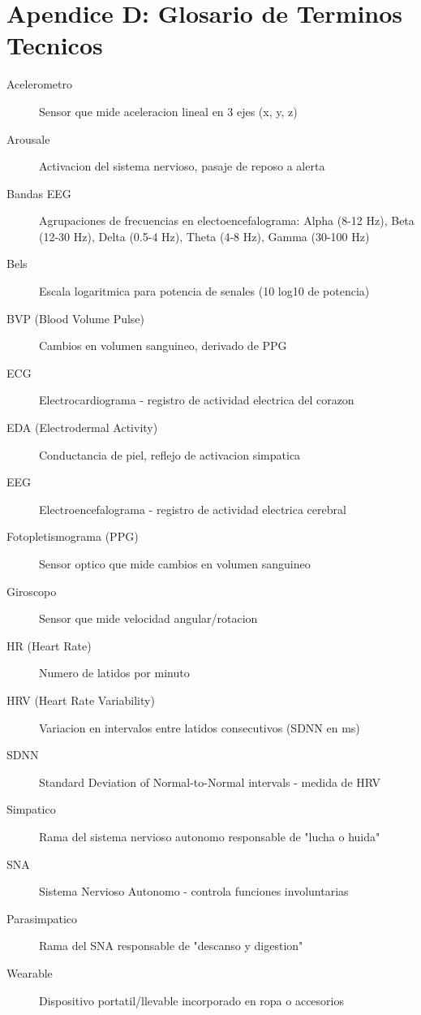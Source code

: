 \section*{Apendice D: Glosario de Terminos Tecnicos}

\begin{description}
    \item[Acelerometro] Sensor que mide aceleracion lineal en 3 ejes (x, y, z)

    \item[Arousale] Activacion del sistema nervioso, pasaje de reposo a alerta

    \item[Bandas EEG] Agrupaciones de frecuencias en electoencefalograma:
    Alpha (8-12 Hz), Beta (12-30 Hz), Delta (0.5-4 Hz), Theta (4-8 Hz), Gamma (30-100 Hz)

    \item[Bels] Escala logaritmica para potencia de senales (10 log10 de potencia)

    \item[BVP (Blood Volume Pulse)] Cambios en volumen sanguineo, derivado de PPG

    \item[ECG] Electrocardiograma - registro de actividad electrica del corazon

    \item[EDA (Electrodermal Activity)] Conductancia de piel, reflejo de activacion simpatica

    \item[EEG] Electroencefalograma - registro de actividad electrica cerebral

    \item[Fotopletismograma (PPG)] Sensor optico que mide cambios en volumen sanguineo

    \item[Giroscopo] Sensor que mide velocidad angular/rotacion

    \item[HR (Heart Rate)] Numero de latidos por minuto

    \item[HRV (Heart Rate Variability)] Variacion en intervalos entre latidos consecutivos (SDNN en ms)

    \item[SDNN] Standard Deviation of Normal-to-Normal intervals - medida de HRV

    \item[Simpatico] Rama del sistema nervioso autonomo responsable de "lucha o huida"

    \item[SNA] Sistema Nervioso Autonomo - controla funciones involuntarias

    \item[Parasimpatico] Rama del SNA responsable de "descanso y digestion"

    \item[Wearable] Dispositivo portatil/llevable incorporado en ropa o accesorios
\end{description}
